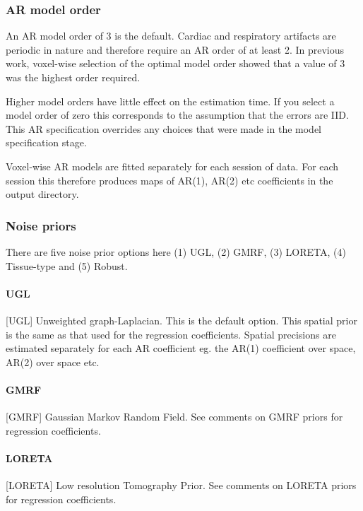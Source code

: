 \subsubsection{AR model order}

An AR model order of 3 is the default. Cardiac and respiratory artifacts are periodic in nature and therefore require an AR order of at least 2. In previous work, voxel-wise selection of the optimal model order showed that a value of 3 was the highest order required. 

Higher model orders have little effect on the estimation time. If you select a model order of zero this corresponds to the assumption that the errors are IID. This AR specification overrides any choices that were made in the model specification stage.

Voxel-wise AR models are fitted separately for each session of data. For each session this therefore produces maps of AR(1), AR(2) etc coefficients in the output directory.

\subsubsection{Noise priors}

There are five noise prior options here (1) UGL, (2) GMRF, (3) LORETA, (4) Tissue-type and (5) Robust.

\paragraph{UGL}

[UGL] Unweighted graph-Laplacian. This is the default option. This spatial prior is the same as that used for the regression coefficients. Spatial precisions are estimated separately for each AR coefficient eg. the AR(1) coefficient over space, AR(2) over space etc. 

\paragraph{GMRF}

[GMRF] Gaussian Markov Random Field. See comments on GMRF priors for regression coefficients.

\paragraph{LORETA}

[LORETA] Low resolution Tomography Prior. See comments on LORETA priors for regression coefficients.


